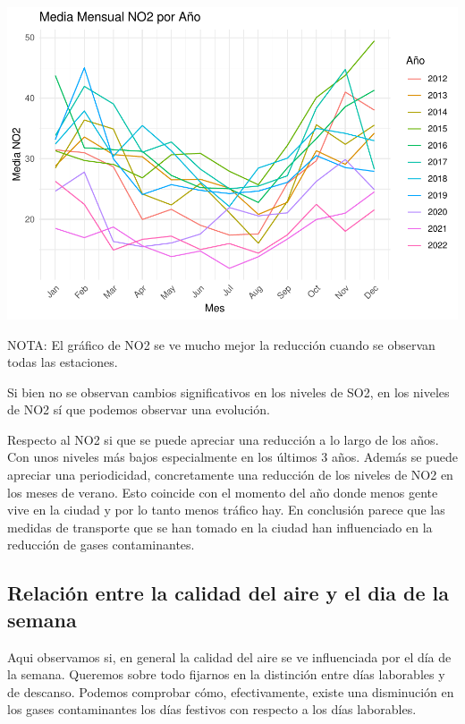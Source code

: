 \documentclass[notspecified,article,submit,moreauthors,pdftex]{Definitions/mdpi}
\begin{document}
\includegraphics{Memoria_files/figure-latex/unnamed-chunk-27-2.pdf}

NOTA: El gráfico de NO2 se ve mucho mejor la reducción cuando se
observan todas las estaciones.

Si bien no se observan cambios significativos en los niveles de SO2, en
los niveles de NO2 sí que podemos observar una evolución.

Respecto al NO2 si que se puede apreciar una reducción a lo largo de los
años. Con unos niveles más bajos especialmente en los últimos 3 años.
Además se puede apreciar una periodicidad, concretamente una reducción
de los niveles de NO2 en los meses de verano. Esto coincide con el
momento del año donde menos gente vive en la ciudad y por lo tanto menos
tráfico hay. En conclusión parece que las medidas de transporte que se
han tomado en la ciudad han influenciado en la reducción de gases
contaminantes.

\hypertarget{relaciuxf3n-entre-la-calidad-del-aire-y-el-dia-de-la-semana}{%
\subsection{Relación entre la calidad del aire y el dia de la
semana}\label{relaciuxf3n-entre-la-calidad-del-aire-y-el-dia-de-la-semana}}

Aqui observamos si, en general la calidad del aire se ve influenciada
por el día de la semana. Queremos sobre todo fijarnos en la distinción
entre días laborables y de descanso. Podemos comprobar cómo,
efectivamente, existe una disminución en los gases contaminantes los
días festivos con respecto a los días laborables.
\end{document}
